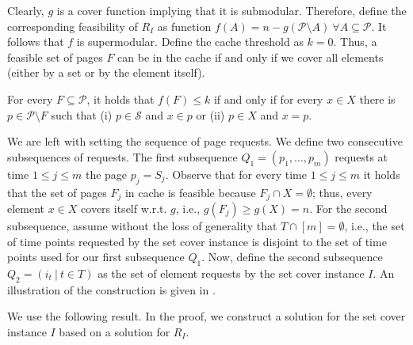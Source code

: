 \documentclass[11pt]{article}
\newcommand{\cP}{{\mathcal{P}}}
\newcommand{\cS}{{\mathcal{S}}}
\begin{document}
{ Clearly, $g$ is a cover function implying that it is submodular. Therefore, define the corresponding feasibility of $R_I$ as function $f(A) = n-g(\cP \setminus A)~\forall A \subseteq \cP$. It follows that $f$ is supermodular. Define the cache threshold as $k = 0$. Thus, a feasible set of pages $F$ can be in the cache if and only if we cover all elements (either by a set or by the element itself). 



\begin{obs}
	\label{obs:F}
	For every $F \subseteq \cP$, it holds that $f(F) \leq k$ if and only if for every $x \in X$ there is $p \in \cP \setminus F$ such that (i) $p \in \cS$ and $x \in p$ or (ii) $p \in X$ and $x = p$. 
\end{obs}


We are left with setting the sequence of page requests. We define two consecutive subsequences of requests. The first subsequence $Q_1 = (p_1,\ldots, p_m)$ requests at time $1 \leq j \leq m$ the page $p_j = S_j$. Observe that for every time $1 \leq j \leq m$ it holds that the set of pages $F_j$ in cache is feasible because $F_j \cap X = \emptyset$; thus, every element $x \in X$ covers itself w.r.t. $g$, i.e., $g(F_j) \geq g(X) = n$. 
For the second subsequence, assume without the loss of generality that $T \cap [m] = \emptyset$, i.e., the set of time points requested by the set cover instance is disjoint to the set of time points used for our first subsequence $Q_1$. Now, define the second subsequence $Q_2 = \left(i_t  ~|~ t \in T\right)$ as the set of element requests by the set cover instance $I$. %
An illustration of the construction is given in . 


We use the following result. In the proof, we construct a solution for the set cover instance $I$ based on a solution for $R_I$.


}
\end{document}
